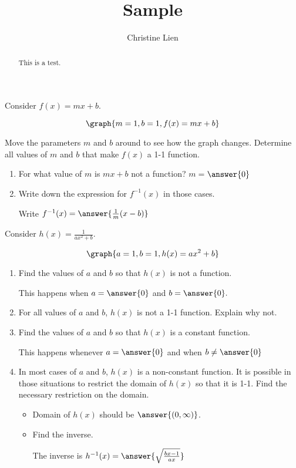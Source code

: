 \documentclass{ximera}
\title{Sample}
\author{Christine Lien}
\begin{document}
\begin{abstract}
This is a test. 
\end{abstract}
\maketitle

Consider $f(x)=mx+b$. 

\[\graph{m=1, b=1, f(x)=mx+b}\]

Move the parameters $m$ and $b$ around to see how the graph changes. 
Determine all values of $m$ and $b$ that make $f(x)$ a 1-1 function. 
\begin{exercise}
\noindent
\begin{enumerate}
\item For what value of $m$ is $mx+b$ not a function? $m=$$\answer{0}$



\item Write down the expression for $f^{-1}(x)$ in those cases. 

Write $f^{-1}(x)= \answer{\frac{1}{m}(x-b)}$

\end{enumerate}

\end{exercise}

\begin{exercise}
Consider $h(x)=\frac{1}{ax^2+b}$. 

\[\graph{a=1, b=1, h(x)=ax^2+b}\]

\begin{enumerate}
\item Find the values of $a$ and $b$ so that $h(x)$ is not a function. 

This happens when $a=\answer{0}$ and $b=\answer{0}.$

\item For all values of $a$ and $b$, $h(x)$ is not a 1-1 function. Explain why not.


\item Find the values of $a$ and $b$ so that $h(x)$ is a constant function. 

This happens whenever $a=\answer{0}$ and when $b\neq\answer{0}$

\item In most cases of $a$ and $b$, $h(x)$ is a non-constant function. It is possible in those situations to restrict the domain of $h(x)$ so that it is 1-1. Find the necessary restriction on the domain. 

\begin{itemize}
\item Domain of $h(x)$ should be $\answer{(0, \infty)}$.

\item Find the inverse. 

The inverse is $h^{-1}(x) = \answer{\sqrt{\frac{bx-1}{ax}}}$

\end{itemize}
\end{enumerate} 

\end{exercise}
\end{document}
